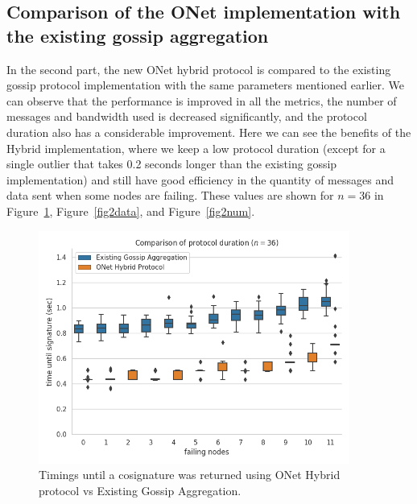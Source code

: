 \subsection{Comparison of the ONet implementation with the existing gossip aggregation}

In the second part, the new ONet hybrid protocol is compared to the existing gossip protocol implementation with the same parameters mentioned earlier.
We can observe that the performance is improved in all the metrics, the number of messages and bandwidth used is decreased significantly, and the protocol duration also has a considerable improvement.
Here we can see the benefits of the Hybrid implementation, where we keep a low protocol duration (except for a single outlier that takes 0.2 seconds longer than the existing gossip implementation) and still have good efficiency in the quantity of messages and data sent when some nodes are failing.
These values are shown for $n = 36$ in Figure~\ref{fig2time}, Figure~\ref{fig2data}, and Figure~\ref{fig2num}.


\begin{figure}[H]
    \centering
    \includegraphics[width=0.91\textwidth]{images/round_wall_sum_36.png}
    \caption{Timings until a cosignature was returned using ONet Hybrid protocol vs Existing Gossip Aggregation.}
    \label{fig2time}
\end{figure}

